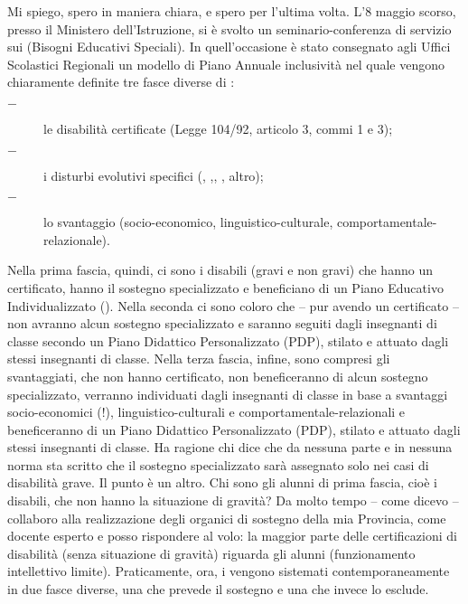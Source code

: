 Mi spiego, spero in maniera chiara, e spero per l'ultima volta. L’8 maggio scorso, presso il Ministero dell'Istruzione, si è svolto un seminario-conferenza di servizio sui  (Bisogni Educativi Speciali). In quell'occasione è stato consegnato agli Uffici Scolastici Regionali un modello di Piano Annuale inclusività nel quale vengono chiaramente definite tre fasce diverse di :
\begin{description}
	\item[$-$]  le disabilità certificate (Legge 104/92, articolo 3, commi 1 e 3);
	\item [$-$]i disturbi evolutivi specifici (,  ,, , altro); %
	\item [$-$]lo svantaggio (socio-economico, linguistico-culturale, comportamentale-relazionale).
\end{description}

Nella prima fascia, quindi, ci sono i disabili (gravi e non gravi) che hanno un certificato, hanno il sostegno specializzato e beneficiano di un Piano Educativo Individualizzato (). Nella seconda ci sono coloro che – pur avendo un certificato – non avranno alcun sostegno specializzato e saranno seguiti dagli insegnanti di classe secondo un Piano Didattico Personalizzato (PDP), stilato e attuato dagli stessi insegnanti di classe. Nella terza fascia, infine, sono compresi gli svantaggiati, che non hanno certificato, non beneficeranno di alcun sostegno specializzato, verranno individuati dagli insegnanti di classe in base a svantaggi socio-economici (!), linguistico-culturali e comportamentale-relazionali e beneficeranno di un Piano Didattico Personalizzato (PDP), stilato e attuato dagli stessi insegnanti di classe.
Ha ragione chi dice che da nessuna parte e in nessuna norma sta scritto che il sostegno specializzato sarà assegnato solo nei casi di disabilità grave. Il punto è un altro. Chi sono gli alunni di prima fascia, cioè i disabili, che non hanno la situazione di gravità? Da molto tempo – come dicevo – collaboro alla realizzazione degli organici di sostegno della mia Provincia, come docente esperto e posso rispondere al volo: la maggior parte delle certificazioni di disabilità (senza situazione di gravità) riguarda gli alunni  (funzionamento intellettivo limite). Praticamente, ora, i  vengono sistemati contemporaneamente in due fasce diverse, una che prevede il sostegno e una che invece lo esclude.
